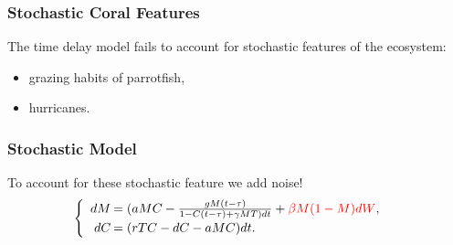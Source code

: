 \begin{frame}\frametitle{Stochastic Coral Features}
The time delay model fails to account for stochastic features of the ecosystem:
\begin{itemize}
\item grazing habits of parrotfish, 
\item hurricanes.
\end{itemize}
\end{frame}

\begin{frame}
\frametitle{Stochastic Model}
To account for these stochastic feature we add noise!
$$\begin{cases}
\begin{array}{rl}
dM\hspace{-.8em}&=(aMC - \frac{gM(t-\tau)}{1-C(t-\tau)+\gamma M T)dt}+{\color{red}\beta M(1-M)dW},\\
dC\hspace{-.8em}&=(rTC  - dC - aMC)dt.\\
\end{array}
\end{cases}$$
\end{frame}

